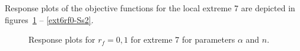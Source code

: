 \documentclass[review,times,3p,twocolumn,10pt]{elsarticle}
\begin{document}
Response plots of the objective functions for the local extreme 7 are depicted in figures~\ref{ext6rf0-an2} -- \ref{ext6rf0-Ss2}.

\begin{figure}[htb!]
\label{ext6rf0-an2}
\caption{Response plots for $r_f=0,1$ for extreme 7 for parameters $\alpha$ and $n$.}
\end{figure}
\end{document}
